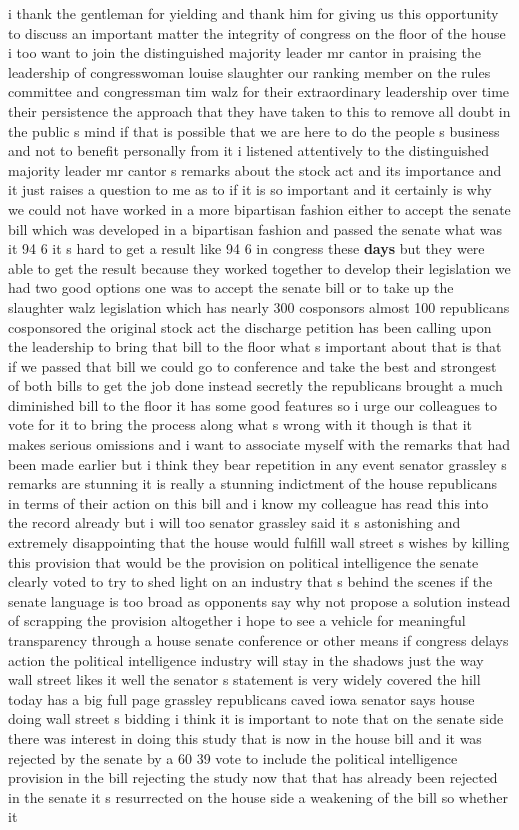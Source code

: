 \documentclass{article}
\begin{document}
i thank the gentleman for yielding and thank him for giving us this opportunity to discuss an important matter the integrity of congress on the floor of the house i too want to join the distinguished majority leader mr cantor in praising the leadership of congresswoman louise slaughter our ranking member on the rules committee and congressman tim walz for their extraordinary leadership over time their persistence the approach that they have taken to this to remove all doubt in the public s mind if that is possible that we are here to do the people s business and not to benefit personally from it i listened attentively to the distinguished majority leader mr cantor s remarks about the stock act and its importance and it just raises a question to me as to if it is so important and it certainly is why we could not have worked in a more bipartisan fashion either to accept the senate bill which was developed in a bipartisan fashion and passed the senate what was it 94 6 it s hard to get a result like 94 6 in congress these {\bf \color{red} days} but they were able to get the result because they worked together to develop their legislation we had two good options one was to accept the senate bill or to take up the slaughter walz legislation which has nearly 300 cosponsors almost 100 republicans cosponsored the original stock act the discharge petition has been calling upon the leadership to bring that bill to the floor what s important about that is that if we passed that bill we could go to conference and take the best and strongest of both bills to get the job done instead secretly the republicans brought a much diminished bill to the floor it has some good features so i urge our colleagues to vote for it to bring the process along what s wrong with it though is that it makes serious omissions and i want to associate myself with the remarks that had been made earlier but i think they bear repetition in any event senator grassley s remarks are stunning it is really a stunning indictment of the house republicans in terms of their action on this bill and i know my colleague has read this into the record already but i will too senator grassley said it s astonishing and extremely disappointing that the house would fulfill wall street s wishes by killing this provision that would be the provision on political intelligence the senate clearly voted to try to shed light on an industry that s behind the scenes if the senate language is too broad as opponents say why not propose a solution instead of scrapping the provision altogether i hope to see a vehicle for meaningful transparency through a house senate conference or other means if congress delays action the political intelligence industry will stay in the shadows just the way wall street likes it well the senator s statement is very widely covered the hill today has a big full page grassley republicans caved iowa senator says house doing wall street s bidding i think it is important to note that on the senate side there was interest in doing this study that is now in the house bill and it was rejected by the senate by a 60 39 vote to include the political intelligence provision in the bill rejecting the study now that that has already been rejected in the senate it s resurrected on the house side a weakening of the bill so whether it 
\end{document}
